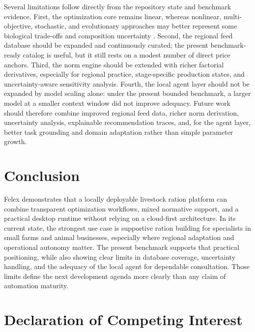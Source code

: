 \documentclass[a4paper,fleqn]{cas-dc}
\begin{document}
Several limitations follow directly from the repository state and benchmark evidence. First, the optimization core remains linear, whereas nonlinear, multi-objective, stochastic, and evolutionary approaches may better represent some biological trade-offs and composition uncertainty \citep{li2022nonlinear, uyeh2018, uyeh2019, das2023, agrawal2025, kumar2025}. Second, the regional feed database should be expanded and continuously curated; the present benchmark-ready catalog is useful, but it still rests on a modest number of direct price anchors. Third, the norm engine should be extended with richer factorial derivatives, especially for regional practice, stage-specific production states, and uncertainty-aware sensitivity analysis. Fourth, the local agent layer should not be expanded by model scaling alone: under the present bounded benchmark, a larger model at a smaller context window did not improve adequacy. Future work should therefore combine improved regional feed data, richer norm derivation, uncertainty analysis, explainable recommendation traces, and, for the agent layer, better task grounding and domain adaptation rather than simple parameter growth.

\section{Conclusion}\label{sec:conclusion}

Felex demonstrates that a locally deployable livestock ration platform can combine transparent optimization workflows, mixed normative support, and a practical desktop runtime without relying on a cloud-first architecture. In its current state, the strongest use case is supportive ration building for specialists in small farms and animal businesses, especially where regional adaptation and operational autonomy matter. The present benchmark supports that practical positioning, while also showing clear limits in database coverage, uncertainty handling, and the adequacy of the local agent for dependable consultation. Those limits define the next development agenda more clearly than any claim of automation maturity.


\section*{Declaration of Competing Interest}
\end{document}
